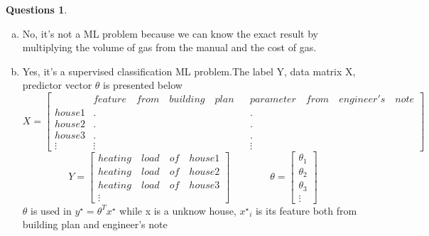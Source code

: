 \documentclass[a4paper,11pt]{article}
\theoremstyle{definition}
\newtheorem{quests}{Questions}
\begin{document}
\begin{quests}
\leavevmode\\
\begin{enumerate}[(a)]
\item No, it's not a ML problem because we can know the exact result by multiplying the volume of gas from the manual and the cost of gas.
\item Yes, it's a supervised classification ML problem.The label Y, data matrix X, predictor vector $\theta$ is presented below\\
\[X=
\begin{bmatrix}
    		& feature \quad from \quad building \quad  plan  & & parameter \quad from \quad engineer's \quad note   \\
    house 1 &       		.			   & &             .\\
    house 2 &				.			   & &             .\\
    house 3 &				.			   & &		      .\\
    \vdots  &						\vdots & &		\vdots
\end{bmatrix}
\]
\[
Y=
\begin{bmatrix}
    heating \quad load \quad of \quad  house 1     \\
    heating \quad load \quad of \quad  house 2		\\ 
    heating \quad load \quad of \quad  house 3      \\ 
    \vdots
\end{bmatrix}
\qquad \qquad \theta=
\begin{bmatrix}
    \theta_1  \\
    \theta_2	\\
    \theta_3  \\ 
    \vdots
\end{bmatrix}
\]
$\theta$ is used in $y^\star=\theta^T x^\star$ while x is a unknow house, ${x^\star}_i$ is its feature both from building plan and engineer's note
\end{enumerate}
\end{quests}

\newpage
\end{document}
